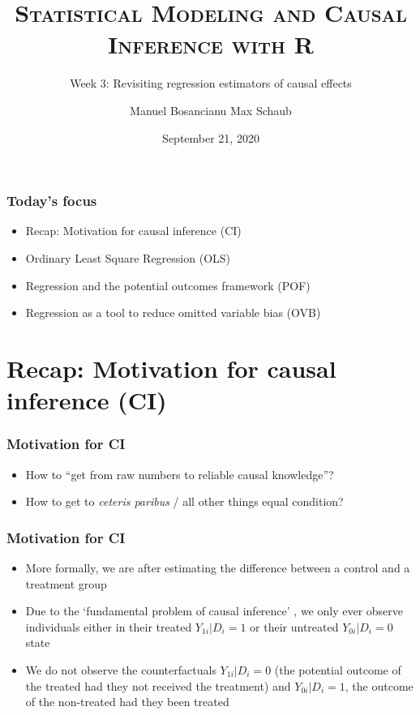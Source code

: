 \documentclass[12pt,english,dvipsnames,aspectratio=169,handout]{beamer}\usepackage[]{graphicx}\usepackage[]{xcolor}
\title{\textsc{Statistical Modeling and Causal Inference with R}}
\subtitle{Week 3: Revisiting regression estimators of causal effects}
\date{September 21, 2020}
\author{Manuel Bosancianu \hfill Max Schaub}
\institute{Hertie School of Governance}
\begin{document}
\maketitle


\begin{frame}
	\frametitle{Today's focus}
	
	\begin{itemize}
		\item Recap: Motivation for causal inference (CI)
		\item Ordinary Least Square Regression (OLS)
		\item Regression and the potential outcomes framework (POF)
		\item Regression as a tool to reduce omitted variable bias (OVB)
	\end{itemize}
	
\end{frame}

\section{Recap: Motivation for causal inference (CI)}


\begin{frame}
	\frametitle{Motivation for CI}
	
	\begin{itemize}
		\setlength\itemsep{1.5em}
		\item How to ``get from raw numbers to reliable causal knowledge''? \cite[xiii]{angrist_mastering_2015}
		\item How to get to \emph{ceteris paribus} / all other things equal condition?
	\end{itemize}
	
\end{frame}


\begin{frame}
	\frametitle{Motivation for CI}
	
	\begin{itemize}
		\item More formally, we are after estimating the difference between a control and a treatment group
		\item Due to the `fundamental problem of causal inference' \cite{holland_statistics_1986}, we only ever observe individuals either in their treated $Y_{1i}|D_i=1$ or their untreated $Y_{0i}|D_i=0$ state
		\item We do not observe the counterfactuals $Y_{1i}|D_i=0$ (the potential outcome of the treated had they not received the treatment) and $Y_{0i}|D_i=1$, the outcome of the non-treated had they been treated
	\end{itemize}
	
\end{frame}
\end{document}
